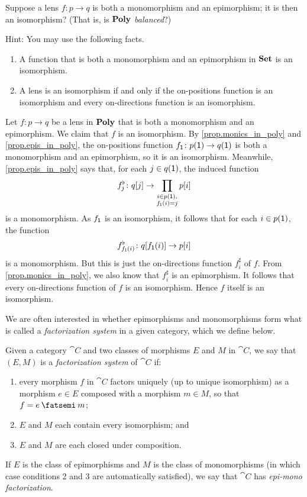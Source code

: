 \documentclass[Book-Poly]{subfiles}
\begin{document}
\begin{exercise}
Suppose a lens $f\colon p\to q$ is both a monomorphism and an epimorphism; it is then an isomorphism? (That is, is $\mathbf{Poly}$ \emph{balanced}?)

Hint: You may use the following facts.
\begin{enumerate}
    \item A function that is both a monomorphism and an epimorphism in $\mathbf{Set}$ is an isomorphism.
    \item A lens is an isomorphism if and only if the on-positions function is an isomorphism and every on-directions function is an isomorphism.
\end{enumerate}
\begin{solution}
Let $f \colon p \to q$ be a lens in $\mathbf{Poly}$ that is both a monomorphism and an epimorphism.
We claim that $f$ is an isomorphism.
By \cref{prop.monics_in_poly} and \cref{prop.epis_in_poly}, the on-positions function $f_{\textsf{1}} \colon p(\textsf{1}) \to q(\textsf{1})$ is both a monomorphism and an epimorphism, so it is an isomorphism.
Meanwhile, \cref{prop.epis_in_poly} says that, for each $j \in q(\textsf{1})$, the induced function
\[
    f^\flat_j \colon q[j] \to \prod_{\substack{i \in p(\textsf{1}), \\ f_{\textsf{1}}(i) = j}} p[i]
\]
is a monomorphism.
As $f_{\textsf{1}}$ is an isomorphism, it follows that for each $i \in p(\textsf{1})$, the function
\[
    f^\flat_{f_{\textsf{1}}(i)} \colon q[f_{\textsf{1}}(i)] \to p[i]
\]
is a monomorphism.
But this is just the on-directions function $f^\sharp_i$ of $f$.
From \cref{prop.monics_in_poly}, we also know that $f^\sharp_i$ is an epimorphism.
It follows that every on-directions function of $f$ is an isomorphism.
Hence $f$ itself is an isomorphism.
\end{solution}
\end{exercise}

We are often interested in whether epimorphisms and monomorphisms form what is called a \emph{factorization system} in a given category, which we define below.

\begin{definition} \label{def.factor}
Given a category $\cat{C}$ and two classes of morphisms $E$ and $M$ in $\cat{C}$, we say that $(E, M)$ is a \emph{factorization system} of $\cat{C}$ if:
\begin{enumerate}
    \item every morphism $f$ in $\cat{C}$ factors uniquely (up to unique isomorphism) as a morphism $e \in E$ composed with a morphism $m\in M$, so that $f = e\then m$;
    \item $E$ and $M$ each contain every isomorphism; and
    \item $E$ and $M$ are each closed under composition.
\end{enumerate}
If $E$ is the class of epimorphisms and $M$ is the class of monomorphisms (in which case conditions 2 and 3 are automatically satisfied), we say that $\cat{C}$ has \emph{epi-mono factorization}.
\end{definition}
\end{document}
